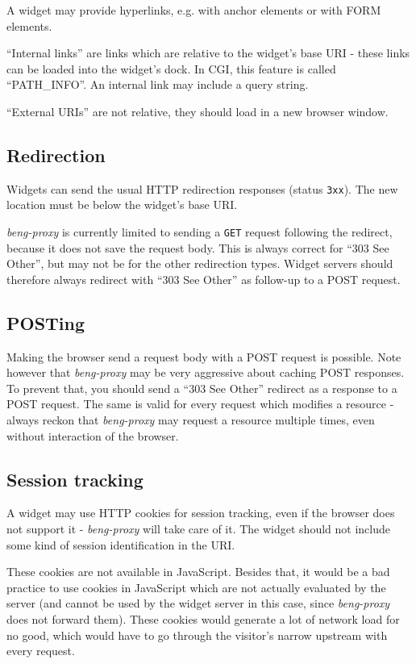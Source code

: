 \documentclass[a4paper,12pt]{article}
\begin{document}
A widget may provide hyperlinks, e.g. with anchor elements or with
FORM elements.

``Internal links'' are links which are relative to the widget's base
URI - these links can be loaded into the widget's dock.  In CGI, this
feature is called ``PATH\_INFO''.  An internal link may include a
query string.

``External URIs'' are not relative, they should
load in a new browser window.

\subsection{Redirection}

Widgets can send the usual HTTP redirection responses (status
\texttt{3xx}).  The new location must be below the widget's base URI.

\emph{beng-proxy} is currently limited to sending a \texttt{GET}
request following the redirect, because it does not save the request
body.  This is always correct for ``303 See Other'', but may not be
for the other redirection types.  Widget servers should therefore
always redirect with ``303 See Other'' as follow-up to a POST request.

\subsection{POSTing}

Making the browser send a request body with a POST request is
possible.  Note however that \emph{beng-proxy} may be very aggressive
about caching POST responses.  To prevent that, you should send a
``303 See Other'' redirect as a response to a POST request.  The same
is valid for every request which modifies a resource - always reckon
that \emph{beng-proxy} may request a resource multiple times, even
without interaction of the browser.

\subsection{Session tracking}

A widget may use HTTP cookies for session tracking, even if the
browser does not support it - \emph{beng-proxy} will take care of it.
The widget should not include some kind of session identification in
the URI.

These cookies are not available in JavaScript.  Besides that, it would
be a bad practice to use cookies in JavaScript which are not actually
evaluated by the server (and cannot be used by the widget server in
this case, since \emph{beng-proxy} does not forward them).  These
cookies would generate a lot of network load for no good, which would
have to go through the visitor's narrow upstream with every request.
\end{document}
